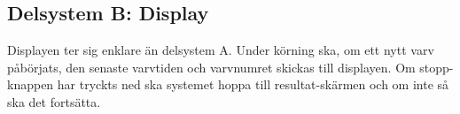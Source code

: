     \subsection{Delsystem B: Display}

    Displayen ter sig enklare än delsystem A. Under körning ska, om ett nytt varv
    påbörjats, den senaste varvtiden och varvnumret skickas till displayen. Om
    stopp-knappen har tryckts ned ska systemet hoppa till resultat-skärmen och om
    inte så ska det fortsätta.

